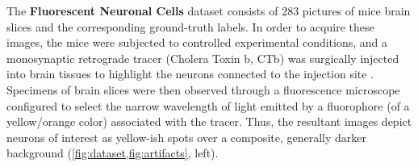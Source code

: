 

The \textbf{Fluorescent Neuronal Cells} dataset \cite{clissa2021fluocells} consists of 283 
pictures 
of mice brain slices and the corresponding ground-truth labels.
In order to acquire these images, the mice were subjected to controlled experimental conditions, and a monosynaptic retrograde tracer (Cholera Toxin b, CTb) was surgically injected into brain tissues to highlight the neurons connected to the injection site
\cite{hitrec2019neural}.
Specimens of brain slices were then observed through  
a fluorescence microscope configured to select the narrow wavelength of light emitted by 
a fluorophore (of a yellow/orange color) associated with the tracer.
Thus, the resultant images depict neurons of interest as
yellow-ish spots
over a composite, generally darker background (\cref{fig:dataset,fig:artifacts}, left).

